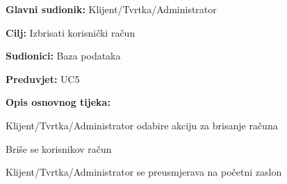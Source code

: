 \noindent {}
\begin{packed_item}
	
	\item \textbf{Glavni sudionik:} Klijent/Tvrtka/Administrator
	\item  \textbf{Cilj:} Izbrisati korisnički račun
	\item  \textbf{Sudionici:} Baza podataka
	\item  \textbf{Preduvjet:} UC5
	\item  \textbf{Opis osnovnog tijeka:}
	
	\item[] \begin{packed_enum}
		
		\item Klijent/Tvrtka/Administrator odabire akciju za brisanje računa
		\item Briše se korisnikov račun
		\item Klijent/Tvrtka/Administrator se preusmjerava na početni zaslon
		
	\end{packed_enum}
\end{packed_item}

\pagebreak

